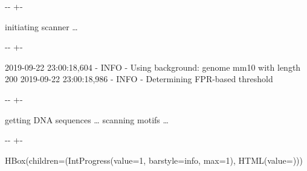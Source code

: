 \documentclass[letterpaper,10pt,english]{sphinxmanual}
\newlength\nbsphinxcodecellspacing
\begin{document}
%
{
\kern-\sphinxverbatimsmallskipamount\kern-\baselineskip
\kern+\FrameHeightAdjust\kern-\fboxrule
\vspace{\nbsphinxcodecellspacing}
%
\begin{sphinxVerbatim}[commandchars=\\\{\}]
initiating scanner {\ldots}
\end{sphinxVerbatim}
}
\relax



%
{
\kern-\sphinxverbatimsmallskipamount\kern-\baselineskip
\kern+\FrameHeightAdjust\kern-\fboxrule
\vspace{\nbsphinxcodecellspacing}
%
\begin{sphinxVerbatim}[commandchars=\\\{\}]
2019-09-22 23:00:18,604 - INFO - Using background: genome mm10 with length 200
2019-09-22 23:00:18,986 - INFO - Determining FPR-based threshold
\end{sphinxVerbatim}
}
\relax



%
{
\kern-\sphinxverbatimsmallskipamount\kern-\baselineskip
\kern+\FrameHeightAdjust\kern-\fboxrule
\vspace{\nbsphinxcodecellspacing}
%
\begin{sphinxVerbatim}[commandchars=\\\{\}]
getting DNA sequences {\ldots}
scanning motifs {\ldots}
\end{sphinxVerbatim}
}
\relax

{

\kern-\sphinxverbatimsmallskipamount\kern-\baselineskip
\kern+\FrameHeightAdjust\kern-\fboxrule
\vspace{\nbsphinxcodecellspacing}

%
\begin{sphinxVerbatim}[commandchars=\\\{\}]
HBox(children=(IntProgress(value=1, bar\PYGZus{}style=\PYGZsq{}info\PYGZsq{}, max=1), HTML(value=\PYGZsq{}\PYGZsq{})))
\end{sphinxVerbatim}
}
\end{document}
